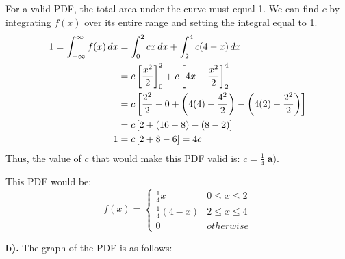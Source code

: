 \documentclass[a4paper, 10pt]{article}
\begin{document}
\begin{solution}
For a valid PDF, the total area under the curve must equal 1. We can find \( c \) by integrating \( f(x) \) over its entire range and setting the integral equal to 1.
\begin{align*}
    1 = \int_{-\infty}^{\infty} f(x)\,dx &= \int_{0}^{2} cx\,dx + \int_{2}^{4} c(4 - x)\,dx \\
    &= c \left[\frac{x^2}{2}\right]_{0}^{2} + c \left[4x - \frac{x^2}{2}\right]_{2}^{4} \\
    &= c \left[\frac{2^2}{2} - 0 + \left(4(4) - \frac{4^2}{2}\right) - \left(4(2) - \frac{2^2}{2}\right)\right] \\
    &= c \left[2 + (16 - 8) - (8 - 2)\right] \\
    1 &= c \left[2 + 8 - 6\right] = 4c \\
\end{align*}
Thus, the value of \( c \) that would make this PDF valid is: \( \boxed{c = \frac{1}{4}} \; \textbf{a).} \)

This PDF would be:
\[
f(x) = \begin{cases}
    \tfrac{1}{4}x & 0 \leq x \le 2 \\
    \tfrac{1}{4}(4 - x) & 2 \leq x \leq 4 \\
    0 & otherwise
\end{cases}
\]

\textbf{b).} The graph of the PDF is as follows:
\begin{center}
\end{center}
\end{solution}
\end{document}
